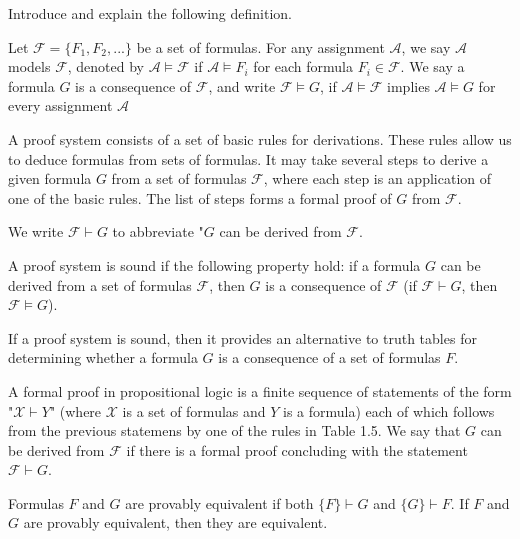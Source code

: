 {\color{red}

Introduce and explain the following definition.

\begin{definition}
Let $\mathcal{F} = \{ F_1, F_2, ... \}$ be a set of formulas. For any assignment $\mathcal{A}$, we say $\mathcal{A}$ models $\mathcal{F}$, denoted by $\mathcal{A} \models \mathcal{F}$ if $\mathcal{A} \models F_i$ for each formula $F_i \in \mathcal{F}$. We say a formula $G$ is a consequence of $\mathcal{F}$, and write $\mathcal{F} \models G$, if $\mathcal{A} \models \mathcal{F}$ implies $\mathcal{A} \models G$ for every assignment $\mathcal{A}$
\end{definition}

}

{\color{red}

A proof system consists of a set of basic rules for derivations. These rules allow us to deduce formulas from sets of formulas. It may take several steps to derive a given formula $G$ from a set of formulas $\mathcal{F}$, where each step is an application of one of the basic rules. The list of steps forms a formal proof of $G$ from $\mathcal{F}$. 

We write $\mathcal{F} \vdash G$ to abbreviate "$G$ can be derived from $\mathcal{F}$.

A proof system is sound if the following property hold: if a formula $G$ can be derived from a set of formulas $\mathcal{F}$, then $G$ is a consequence of $\mathcal{F}$ (if $\mathcal{F} \vdash G$, then $\mathcal{F} \models G$).

If a proof system is sound, then it provides an alternative to truth tables for determining whether a formula $G$ is a consequence of a set of formulas $F$.

\begin{definition}
A formal proof in propositional logic is a finite sequence of statements of the form "$\mathcal{X} \vdash Y$" (where $\mathcal{X}$ is a set of formulas and $Y$ is a formula) each of which follows from the previous statemens by one of the rules in Table 1.5. We say that $G$ can be derived from $\mathcal{F}$ if there is a formal proof concluding with the statement $\mathcal{F} \vdash G$.
\end{definition}

}

{\color{red}

Formulas $F$ and $G$ are provably equivalent if both $\{ F \} \vdash G$ and $\{ G \} \vdash F$. If $F$ and $G$ are provably equivalent, then they are equivalent.

}

